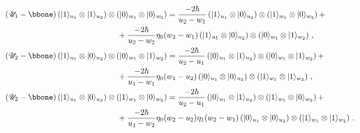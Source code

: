 \documentclass[10pt]{article}
\theoremstyle{definition}
\def\sU{{\mathscr{U}}}
\numberwithin{equation}{section}
\begin{document}
\begin{equation}
	\begin{aligned}
	&\left(\sU_1-\bbone\right)\left(|1\rangle_{u_1}\otimes |1\rangle_{u_2}\right)\otimes \left(|0\rangle_{w_1}\otimes |0\rangle_{w_2}\right)=\frac{-2\hbar}{u_2-w_1}\left(|1\rangle_{u_1}\otimes |0\rangle_{u_2}\right)\otimes \left(|1\rangle_{w_1}\otimes |0\rangle_{w_2}\right)+\\
	&\hspace{5cm}+\frac{-2\hbar}{u_2-w_2}\eta_0(w_2-w_1)\left(|1\rangle_{u_1}\otimes |0\rangle_{u_2}\right)\otimes \left(|0\rangle_{w_1}\otimes |1\rangle_{w_2}\right)\,,\\
	&\left(\sU_2-\bbone\right)\left(|1\rangle_{u_1}\otimes |0\rangle_{u_2}\right)\otimes \left(|0\rangle_{w_1}\otimes |1\rangle_{w_2}\right)=\frac{-2\hbar}{u_2-u_1}\left(|0\rangle_{u_1}\otimes |1\rangle_{u_2}\right)\otimes \left(|0\rangle_{w_1}\otimes |1\rangle_{w_2}\right)+\\
	&\hspace{5cm}+\frac{-2\hbar}{u_1-w_1}\eta_0(w_1-u_2)\left(|0\rangle_{u_1}\otimes |0\rangle_{u_2}\right)\otimes \left(|1\rangle_{w_1}\otimes |1\rangle_{w_2}\right)\,,\\
	&\left(\sU_2-\bbone\right)\left(|1\rangle_{u_1}\otimes |0\rangle_{u_2}\right)\otimes \left(|1\rangle_{w_1}\otimes |0\rangle_{w_2}\right)=\frac{-2\hbar}{u_2-u_1}\left(|0\rangle_{u_1}\otimes |1\rangle_{u_2}\right)\otimes \left(|1\rangle_{w_1}\otimes |0\rangle_{w_2}\right)+\\
	&\hspace{5cm}+\frac{-2\hbar}{u_1-w_2}\eta_0(w_2-u_2)\eta_1(w_2-w_1)\left(|0\rangle_{u_1}\otimes |0\rangle_{u_2}\right)\otimes \left(|1\rangle_{w_1}\otimes |1\rangle_{w_2}\right)\,.
	\end{aligned}
\end{equation}
\end{document}
